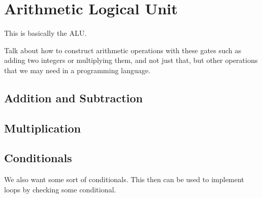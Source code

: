 \section{Arithmetic Logical Unit}

  This is basically the ALU. 

  Talk about how to construct arithmetic operations with these gates such as adding two integers or multiplying them, and not just that, but other operations that we may need in a programming language. 

\subsection{Addition and Subtraction} 

\subsection{Multiplication} 

  \begin{theorem}
    
  \end{theorem}

  \begin{theorem}
    
  \end{theorem}

  \begin{theorem}
    
  \end{theorem}

  \begin{theorem}
    
  \end{theorem}

  \begin{theorem}
    
  \end{theorem}

\subsection{Conditionals}

  We also want some sort of conditionals. This then can be used to implement loops by checking some conditional. 

  \begin{theorem}
    
  \end{theorem}



